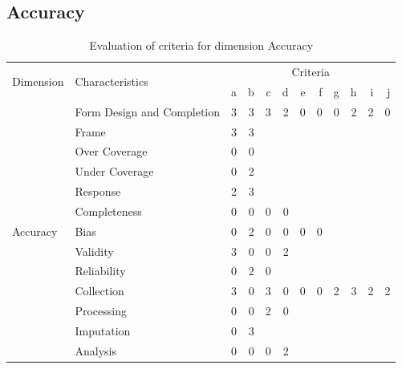 \subsection{Accuracy}

\begin{table}[htbp]
    \centering

    \begin{tabular}{llrrrrrrrrrr}
        \toprule
        \multirow{2}{*}{Dimension}  & \multirow{2}{*}{Characteristics}  & \multicolumn{10}{c}{Criteria}         \\ \cmidrule(lr){3-12}
                                    &                                   & a & b & c & d & e & f & g & h & i & j \\ \midrule
        \multirow{13}{*}{Accuracy}  & Form Design and Completion        & 3 & 3 & 3 & 2 & 0 & 0 & 0 & 2 & 2 & 0 \\
                                    & Frame                             & 3 & 3 &   &   &   &   &   &   &   &   \\
                                    & Over Coverage                     & 0 & 0 &   &   &   &   &   &   &   &   \\
                                    & Under Coverage                    & 0 & 2 &   &   &   &   &   &   &   &   \\
                                    & Response                          & 2 & 3 &   &   &   &   &   &   &   &   \\
                                    & Completeness                      & 0 & 0 & 0 & 0 &   &   &   &   &   &   \\
                                    & Bias                              & 0 & 2 & 0 & 0 & 0 & 0 &   &   &   &   \\
                                    & Validity                          & 3 & 0 & 0 & 2 &   &   &   &   &   &   \\
                                    & Reliability                       & 0 & 2 & 0 &   &   &   &   &   &   &   \\
                                    & Collection                        & 3 & 0 & 3 & 0 & 0 & 0 & 2 & 3 & 2 & 2 \\
                                    & Processing                        & 0 & 0 & 2 & 0 &   &   &   &   &   &   \\
                                    & Imputation                        & 0 & 3 &   &   &   &   &   &   &   &   \\
                                    & Analysis                          & 0 & 0 & 0 & 2 &   &   &   &   &   &   \\
        \bottomrule
    \end{tabular}

    \caption{Evaluation of criteria for dimension Accuracy}
    \label{table:accuracy-benchmark}
\end{table}
\FloatBarrier


